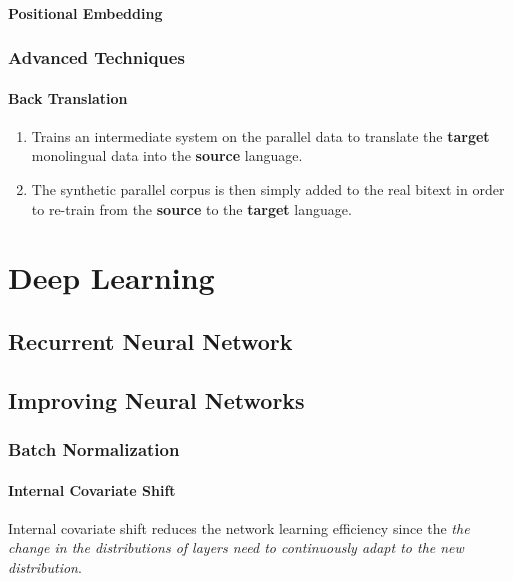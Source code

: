 \documentclass[a3paper, 12pt]{book} %
\begin{document}
\subsection{Positional Embedding}

\section{Advanced Techniques}
\subsection{Back Translation}
\begin{enumerate}
\item Trains an intermediate system on the parallel data to translate the \textbf{target} monolingual data into
the \textbf{source} language. 
\item The synthetic parallel corpus is then
simply added to the real bitext in order to re-train from the \textbf{source}
to the \textbf{target} language.
\end{enumerate}

\cite{edunov2018understanding}



\part{Deep Learning}

\chapter{Recurrent Neural Network}

\chapter{Improving Neural Networks}
\section{Batch Normalization}
\subsection{Internal Covariate Shift}
Internal covariate shift reduces the network learning efficiency since the \emph{the change in the distributions of layers need to continuously adapt to the new distribution}.
\end{document}
